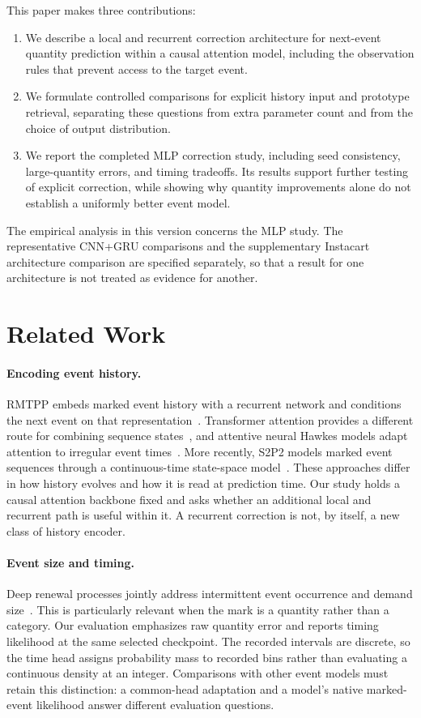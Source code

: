 \documentclass[runningheads]{llncs}
\begin{document}
This paper makes three contributions:
\begin{enumerate}
\item We describe a local and recurrent correction architecture for next-event quantity prediction within a causal attention model, including the observation rules that prevent access to the target event.
\item We formulate controlled comparisons for explicit history input and prototype retrieval, separating these questions from extra parameter count and from the choice of output distribution.
\item We report the completed MLP correction study, including seed consistency, large-quantity errors, and timing tradeoffs. Its results support further testing of explicit correction, while showing why quantity improvements alone do not establish a uniformly better event model.
\end{enumerate}
The empirical analysis in this version concerns the MLP study. The representative CNN+GRU comparisons and the supplementary Instacart architecture comparison are specified separately, so that a result for one architecture is not treated as evidence for another.

\section{Related Work}
\paragraph{Encoding event history.}
RMTPP embeds marked event history with a recurrent network and conditions the next event on that representation~\cite{du2016rmtpp}. Transformer attention provides a different route for combining sequence states~\cite{vaswani2017attention}, and attentive neural Hawkes models adapt attention to irregular event times~\cite{yang2022anhp}. More recently, S2P2 models marked event sequences through a continuous-time state-space model~\cite{chang2025s2p2}. These approaches differ in how history evolves and how it is read at prediction time. Our study holds a causal attention backbone fixed and asks whether an additional local and recurrent path is useful within it. A recurrent correction is not, by itself, a new class of history encoder.

\paragraph{Event size and timing.}
Deep renewal processes jointly address intermittent event occurrence and demand size~\cite{turkmen2021renewal}. This is particularly relevant when the mark is a quantity rather than a category. Our evaluation emphasizes raw quantity error and reports timing likelihood at the same selected checkpoint. The recorded intervals are discrete, so the time head assigns probability mass to recorded bins rather than evaluating a continuous density at an integer. Comparisons with other event models must retain this distinction: a common-head adaptation and a model's native marked-event likelihood answer different evaluation questions.
\end{document}
